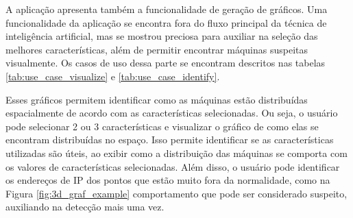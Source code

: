 A aplicação apresenta também a funcionalidade de geração de gráficos. Uma funcionalidade da aplicação se encontra fora do fluxo principal da técnica de inteligência artificial, mas se mostrou preciosa para auxiliar na seleção das melhores características, além de permitir encontrar máquinas suspeitas visualmente. Os casos de uso dessa parte se encontram descritos nas tabelas \ref{tab:use_case_visualize} e \ref{tab:use_case_identify}.

Esses gráficos permitem identificar como as máquinas estão distribuídas espacialmente de acordo com as características selecionadas. Ou seja, o usuário pode selecionar 2 ou 3 características e visualizar o gráfico de como elas se encontram distribuídas no espaço. Isso permite identificar se as características utilizadas são úteis, ao exibir como a distribuição das máquinas se comporta com os valores de características selecionadas. Além disso, o usuário pode identificar os endereços de IP dos pontos que estão muito fora da normalidade, como na Figura \ref{fig:3d_graf_example} comportamento que pode ser considerado suspeito, auxiliando na detecção mais uma vez.
